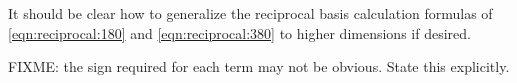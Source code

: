 
It should be clear how to generalize the reciprocal basis calculation formulas of
\cref{eqn:reciprocal:180} and \cref{eqn:reciprocal:380} to higher dimensions if desired.

FIXME: the sign required for each term may not be obvious.  State this explicitly.



